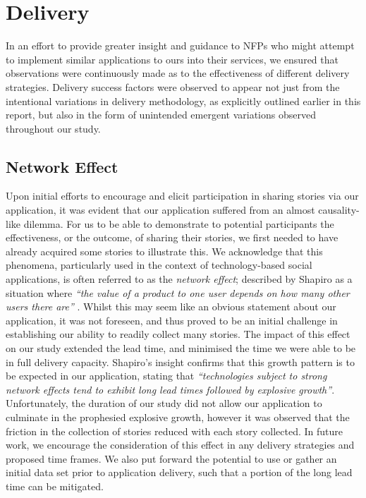 \section{Delivery}

In an effort to provide greater insight and guidance to NFPs who might attempt to implement similar applications to ours into their services, we ensured that observations were continuously made as to the effectiveness of different delivery strategies. Delivery success factors were observed to appear not just from the intentional variations in delivery methodology, as explicitly outlined earlier in this report, but also in the form of unintended emergent variations observed throughout our study.

\subsection{Network Effect}

Upon initial efforts to encourage and elicit participation in sharing stories via our application, it was evident that our application suffered from an almost causality-like dilemma. For us to be able to demonstrate to potential participants the effectiveness, or the outcome, of sharing their stories, we first needed to have already acquired some stories to illustrate this. We acknowledge that this phenomena, particularly used in the context of technology-based social applications, is often referred to as the \emph{network effect}; described by Shapiro as a situation where \emph{“the value of a product to one user depends on how many other users there are”} \cite[p.~13]{shapiro1998information}. Whilst this may seem like an obvious statement about our application, it was not foreseen, and thus proved to be an initial challenge in establishing our ability to readily collect many stories. The impact of this effect on our study extended the lead time, and minimised the time we were able to be in full delivery capacity. Shapiro's insight confirms that this growth pattern is to be expected in our application, stating that \emph{“technologies subject to strong network effects tend to exhibit long lead times followed by explosive growth”}. Unfortunately, the duration of our study did not allow our application to culminate in the prophesied explosive growth, however it was observed that the friction in the collection of stories reduced with each story collected. In future work, we encourage the consideration of this effect in any delivery strategies and proposed time frames. We also put forward the potential to use or gather an initial data set prior to application delivery, such that a portion of the long lead time can be mitigated.

